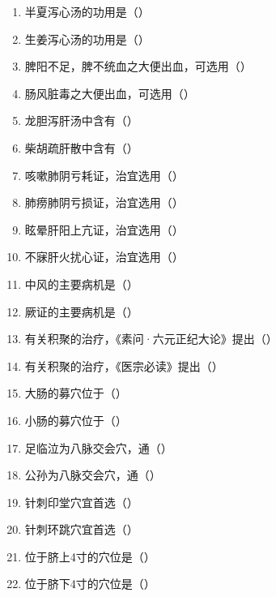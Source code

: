 \documentclass[a4paper,11pt]{ctexart}
\begin{document}
\begin{enumerate}[resume]
      \item 半夏泻心汤的功用是（\quad）
      \item 生姜泻心汤的功用是（\quad）
      \item 脾阳不足，脾不统血之大便出血，可选用（\quad）
      \item 肠风脏毒之大便出血，可选用（\quad）
      \item 龙胆泻肝汤中含有（\quad）
      \item 柴胡疏肝散中含有（\quad）
      \item 咳嗽肺阴亏耗证，治宜选用（\quad）
      \item 肺痨肺阴亏损证，治宜选用（\quad）
      \item 眩晕肝阳上亢证，治宜选用（\quad）
      \item 不寐肝火扰心证，治宜选用（\quad）
      \item 中风的主要病机是（\quad）
      \item 厥证的主要病机是（\quad）
      \item 有关积聚的治疗，《素问·六元正纪大论》提出（\quad）
      \item 有关积聚的治疗，《医宗必读》提出（\quad）
      \item 大肠的募穴位于（\quad）
      \item 小肠的募穴位于（\quad）
      \item 足临泣为八脉交会穴，通（\quad）
      \item 公孙为八脉交会穴，通（\quad）
      \item 针刺印堂穴宜首选（\quad）
      \item 针刺环跳穴宜首选（\quad）
      \item 位于脐上4寸的穴位是（\quad）
      \item 位于脐下4寸的穴位是（\quad）
\end{enumerate}
\end{document}
